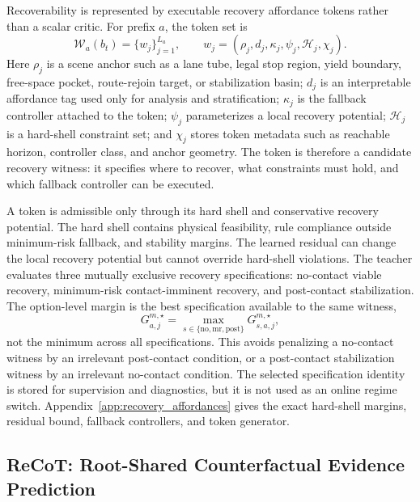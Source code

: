 \documentclass[conference]{IEEEtran}
\begin{document}
Recoverability is represented by executable recovery affordance tokens rather than a scalar critic.  For prefix $a$, the token set is
\begin{equation}
\label{eq:method_affordance_set}
    \mathcal W_a(b_t)=\{w_j\}_{j=1}^{L_a},\qquad
    w_j=(\rho_j,d_j,\kappa_j,\psi_j,\mathcal H_j,\chi_j).
\end{equation}
Here $\rho_j$ is a scene anchor such as a lane tube, legal stop region, yield boundary, free-space pocket, route-rejoin target, or stabilization basin; $d_j$ is an interpretable affordance tag used only for analysis and stratification; $\kappa_j$ is the fallback controller attached to the token; $\psi_j$ parameterizes a local recovery potential; $\mathcal H_j$ is a hard-shell constraint set; and $\chi_j$ stores token metadata such as reachable horizon, controller class, and anchor geometry.  The token is therefore a candidate recovery witness: it specifies where to recover, what constraints must hold, and which fallback controller can be executed.

A token is admissible only through its hard shell and conservative recovery potential.  The hard shell contains physical feasibility, rule compliance outside minimum-risk fallback, and stability margins.  The learned residual can change the local recovery potential but cannot override hard-shell violations.  The teacher evaluates three mutually exclusive recovery specifications: no-contact viable recovery, minimum-risk contact-imminent recovery, and post-contact stabilization.  The option-level margin is the best specification available to the same witness,
\begin{equation}
\label{eq:method_margin}
    G_{a,j}^{m,\star}=\max_{s\in\{\mathrm{no},\mathrm{mr},\mathrm{post}\}}
    G_{s,a,j}^{m,\star},
\end{equation}
not the minimum across all specifications.  This avoids penalizing a no-contact witness by an irrelevant post-contact condition, or a post-contact stabilization witness by an irrelevant no-contact condition.  The selected specification identity is stored for supervision and diagnostics, but it is not used as an online regime switch.  Appendix~\ref{app:recovery_affordances} gives the exact hard-shell margins, residual bound, fallback controllers, and token generator.

\subsection{ReCoT: Root-Shared Counterfactual Evidence Prediction}
\label{subsec:recot}
\end{document}
